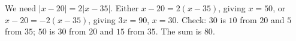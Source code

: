 We need $|x-20|=2|x-35|$. Either $x-20=2(x-35)$, giving $x=50$, or $x-20=-2(x-35)$, giving $3x=90$, $x=30$. Check: $30$ is $10$ from $20$ and $5$ from $35$; $50$ is $30$ from $20$ and $15$ from $35$. The sum is $\boxed{80}$.
